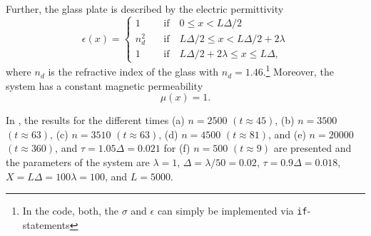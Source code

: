 \documentclass[11pt, A4paper]{article}
\begin{document}
\noindent Further, the glass plate is described by the electric permittivity
\begin{equation}
    \epsilon (x)=
    \begin{cases}
        1   \quad &\text{if} \quad 0 \leq x < L \Delta/2 \\
        n_d^2 \quad &\text{if} \quad L \Delta/2 \leq x < L \Delta/2 + 2 \lambda \\
        1   \quad &\text{if} \quad L \Delta/2 + 2 \lambda \leq x \leq L \Delta,
    \end{cases}
\end{equation}
where $n_d$ is the refractive index of the glass with $n_d=1.46$.\footnote{In the code, both, the $\sigma$ and $\epsilon$ can simply be implemented via \texttt{if}-statements} Moreover, the system has a constant magnetic permeability
\begin{equation}
    \mu(x) = 1.
\end{equation}

In , the results for the different times (a) $n=2500$ $(t\approx 45)$, (b) $n=3500$ $(t\approx 63)$, (c) $n=3510$ $(t\approx 63)$, (d) $n=4500$ $(t\approx 81)$, and (e) $n=20000$ $(t\approx360)$, and $\tau=1.05 \Delta=0.021$ for (f) $n=500$ $(t\approx 9)$ are presented and the parameters of the system are $\lambda=1$, $\Delta=\lambda/50=0.02$, $\tau=0.9 \Delta=0.018$, $X=L\Delta=100 \lambda=100$, and $L=5000$.
\end{document}
